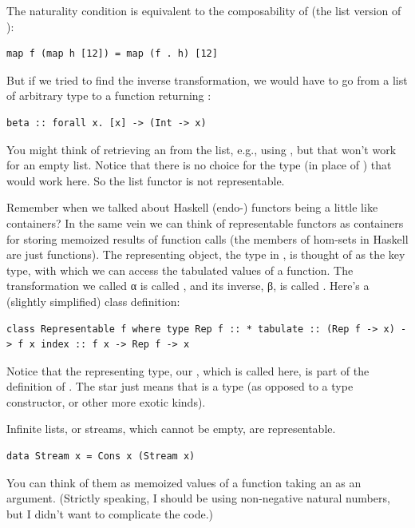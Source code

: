 The naturality condition is equivalent to the composability of
 (the list version of ):

\begin{verbatim}
map f (map h [12]) = map (f . h) [12]
\end{verbatim}

But if we tried to find the inverse transformation, we would have to go
from a list of arbitrary type  to a function returning
:

\begin{verbatim}
beta :: forall x. [x] -> (Int -> x)
\end{verbatim}

You might think of retrieving an  from the list, e.g., using
, but that won't work for an empty list. Notice that there
is no choice for the type  (in place of ) that
would work here. So the list functor is not representable.

Remember when we talked about Haskell (endo-) functors being a little
like containers? In the same vein we can think of representable functors
as containers for storing memoized results of function calls (the
members of hom-sets in Haskell are just functions). The representing
object, the type  in , is thought of as the
key type, with which we can access the tabulated values of a function.
The transformation we called α is called , and its
inverse, β, is called . Here's a (slightly simplified)
 class definition:

\begin{verbatim}
class Representable f where type Rep f :: * tabulate :: (Rep f -> x) -> f x index :: f x -> Rep f -> x
\end{verbatim}

Notice that the representing type, our , which is called
 here, is part of the definition of
. The star just means that  is a
type (as opposed to a type constructor, or other more exotic kinds).

Infinite lists, or streams, which cannot be empty, are representable.

\begin{verbatim}
data Stream x = Cons x (Stream x)
\end{verbatim}

You can think of them as memoized values of a function taking an
 as an argument. (Strictly speaking, I should be using
non-negative natural numbers, but I didn't want to complicate the code.)

